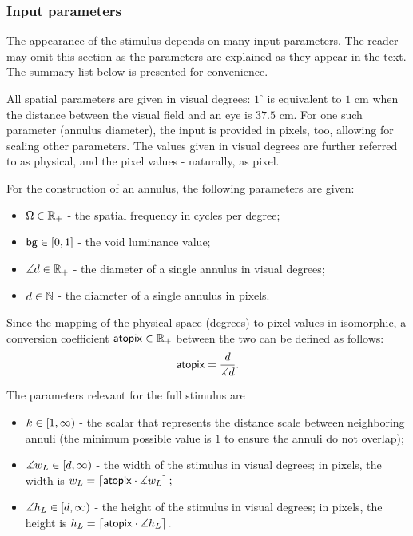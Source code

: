 \subsubsection{Input parameters}
\label{sec:stimulus-parameters}

The appearance of the stimulus depends on many input parameters.
The reader may omit this section as the parameters are explained as they appear in the text. The summary list below is presented for convenience.

All spatial parameters are given in visual degrees: $1^\circ$ is equivalent to $1$ cm when the distance between the visual field and an eye is $37.5$ cm. For one such parameter (annulus diameter), the input is provided in pixels, too, allowing for scaling other parameters. The values given in visual degrees are further referred to as physical, and the pixel values - naturally, as pixel.

For the construction of an annulus, the following parameters are given:
\begin{itemize}
    \item $\Omega \in \mathbb{R}_+$ - the spatial frequency in cycles per degree;
    
    \item $\mathsf{bg} \in [0, 1]$ - the void luminance value;
    
    \item $\measuredangle d \in \mathbb{R}_+$ - the diameter of a single annulus in visual degrees;
    
    \item $d \in \mathbb{N}$ - the diameter of a single annulus in pixels.
\end{itemize}
Since the mapping of the physical space (degrees) to pixel values in isomorphic, a conversion coefficient $\mathsf{atopix} \in \mathbb{R}_+$ between the two can be defined as follows:
\begin{equation}
    \mathsf{atopix} = \frac{d}{\measuredangle d}.
\end{equation}

The parameters relevant for the full stimulus are
\begin{itemize}
    \item $k \in [1, \infty)$ - the scalar that represents the distance scale between neighboring annuli (the minimum possible value is $1$ to ensure the annuli do not overlap);
    
    \item $\measuredangle w_L \in [d, \infty)$ - the width of the stimulus in visual degrees; in pixels, the width is
    $
        w_L = \left\lceil \mathsf{atopix} \cdot \measuredangle w_L \right\rceil;
    $
    
    \item $\measuredangle h_L \in [d, \infty)$ - the height of the stimulus in visual degrees; in pixels, the height is
    $
        h_L = \left\lceil \mathsf{atopix} \cdot \measuredangle h_L \right\rceil.
    $
\end{itemize}

